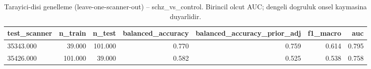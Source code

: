 \begin{table}[htbp]
  \centering
  \caption{Tarayici-disi genelleme (leave-one-scanner-out) -- schz\_vs\_control. Birincil olcut AUC; dengeli dogruluk onsel kaymasina duyarlidir.}
  \label{tab:loso_schz_vs_control}
  \small
  \begin{tabular}{lrrrrrr}
    \toprule
    test\_scanner & n\_train & n\_test & balanced\_accuracy & balanced\_accuracy\_prior\_adj & f1\_macro & auc \\
    \midrule
    35343.000 & 39.000 & 101.000 & 0.770 & 0.759 & 0.614 & 0.795 \\
    35426.000 & 101.000 & 39.000 & 0.582 & 0.525 & 0.538 & 0.758 \\
    \bottomrule
  \end{tabular}
\end{table}
